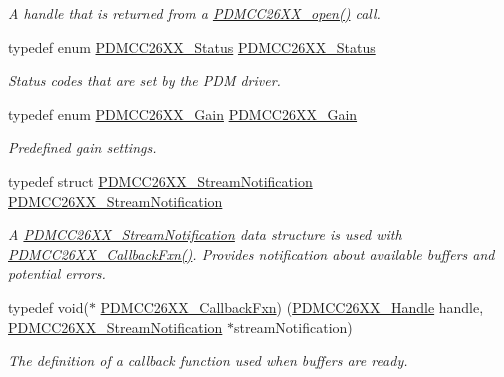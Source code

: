 \begin{DoxyCompactItemize}
\begin{DoxyCompactList}\small\item\em A handle that is returned from a \hyperlink{_p_d_m_c_c26_x_x_8h_a431d9b71e0d0eebd5ab85960f1c82ee0}{P\+D\+M\+C\+C26\+X\+X\+\_\+open()} call. \end{DoxyCompactList}\item 
typedef enum \hyperlink{_p_d_m_c_c26_x_x_8h_afbfe993e790be75708df00186070a779}{P\+D\+M\+C\+C26\+X\+X\+\_\+\+Status} \hyperlink{_p_d_m_c_c26_x_x_8h_affb09af7b7de674b100b1170d574f86c}{P\+D\+M\+C\+C26\+X\+X\+\_\+\+Status}
\begin{DoxyCompactList}\small\item\em Status codes that are set by the P\+D\+M driver. \end{DoxyCompactList}\item 
typedef enum \hyperlink{_p_d_m_c_c26_x_x_8h_a8c2d67aee547a2c8228465034ae0267f}{P\+D\+M\+C\+C26\+X\+X\+\_\+\+Gain} \hyperlink{_p_d_m_c_c26_x_x_8h_a62dc3dc8663629a376fc5e4e546bfd05}{P\+D\+M\+C\+C26\+X\+X\+\_\+\+Gain}
\begin{DoxyCompactList}\small\item\em Predefined gain settings. \end{DoxyCompactList}\item 
typedef struct \hyperlink{struct_p_d_m_c_c26_x_x___stream_notification}{P\+D\+M\+C\+C26\+X\+X\+\_\+\+Stream\+Notification} \hyperlink{_p_d_m_c_c26_x_x_8h_abebd17c183efa14ae0ebe9c229f6c577}{P\+D\+M\+C\+C26\+X\+X\+\_\+\+Stream\+Notification}
\begin{DoxyCompactList}\small\item\em A \hyperlink{struct_p_d_m_c_c26_x_x___stream_notification}{P\+D\+M\+C\+C26\+X\+X\+\_\+\+Stream\+Notification} data structure is used with \hyperlink{_p_d_m_c_c26_x_x_8h_ab6fdee59a79029e938e3fbf0e446fa91}{P\+D\+M\+C\+C26\+X\+X\+\_\+\+Callback\+Fxn()}. Provides notification about available buffers and potential errors. \end{DoxyCompactList}\item 
typedef void($\ast$ \hyperlink{_p_d_m_c_c26_x_x_8h_ab6fdee59a79029e938e3fbf0e446fa91}{P\+D\+M\+C\+C26\+X\+X\+\_\+\+Callback\+Fxn}) (\hyperlink{_p_d_m_c_c26_x_x_8h_ae5b9ecc0f8eb494e162b4a0a49c0636a}{P\+D\+M\+C\+C26\+X\+X\+\_\+\+Handle} handle, \hyperlink{struct_p_d_m_c_c26_x_x___stream_notification}{P\+D\+M\+C\+C26\+X\+X\+\_\+\+Stream\+Notification} $\ast$stream\+Notification)
\begin{DoxyCompactList}\small\item\em The definition of a callback function used when buffers are ready. \end{DoxyCompactList}\item 

\end{DoxyCompactItemize}
